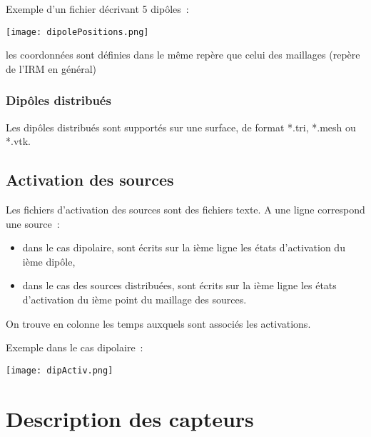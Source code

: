 \medskip

\noindent
Exemple d'un fichier décrivant 5 dipôles~:

\centerline{\texttt{[image: dipolePositions.png]}}

\begin{note}
    les coordonnées sont définies dans le même repère que celui des maillages (repère de l'IRM en général)
\end{note}

\subsubsection{Dipôles distribués}
Les dipôles distribués sont supportés sur une surface, de format *.tri, *.mesh ou *.vtk.
\subsection{Activation des sources}
\label{sec:activ}

\noindent
Les fichiers d'activation des sources sont des fichiers texte. A une ligne correspond une source~:
\begin{itemize}
    \item dans le cas dipolaire, sont écrits sur la ième ligne les états d'activation du ième dipôle,
    \item dans le cas des sources distribuées, sont écrits sur la ième ligne les états d'activation du ième point du maillage
          des sources.
\end{itemize}

\medskip

\noindent
On trouve en colonne les temps auxquels sont associés les activations.

\medskip

\noindent
Exemple dans le cas dipolaire~:

\centerline{\texttt{[image: dipActiv.png]}}


\section{Description des capteurs}
\label{sec:sensors}

